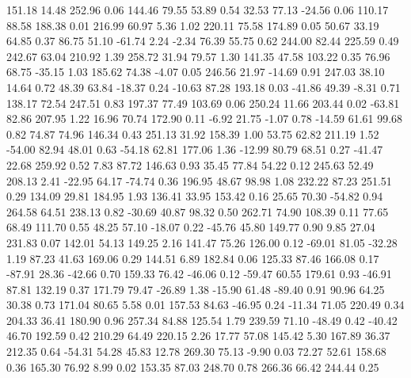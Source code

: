   151.18   14.48  252.96    0.06
  144.46   79.55   53.89    0.54
   32.53   77.13  -24.56    0.06
  110.17   88.58  188.38    0.01
  216.99   60.97    5.36    1.02
  220.11   75.58  174.89    0.05
   50.67   33.19   64.85    0.37
   86.75   51.10  -61.74    2.24
   -2.34   76.39   55.75    0.62
  244.00   82.44  225.59    0.49
  242.67   63.04  210.92    1.39
  258.72   31.94   79.57    1.30
  141.35   47.58  103.22    0.35
   76.96   68.75  -35.15    1.03
  185.62   74.38   -4.07    0.05
  246.56   21.97  -14.69    0.91
  247.03   38.10   14.64    0.72
   48.39   63.84  -18.37    0.24
  -10.63   87.28  193.18    0.03
  -41.86   49.39   -8.31    0.71
  138.17   72.54  247.51    0.83
  197.37   77.49  103.69    0.06
  250.24   11.66  203.44    0.02
  -63.81   82.86  207.95    1.22
   16.96   70.74  172.90    0.11
   -6.92   21.75   -1.07    0.78
  -14.59   61.61   99.68    0.82
   74.87   74.96  146.34    0.43
  251.13   31.92  158.39    1.00
   53.75   62.82  211.19    1.52
  -54.00   82.94   48.01    0.63
  -54.18   62.81  177.06    1.36
  -12.99   80.79   68.51    0.27
  -41.47   22.68  259.92    0.52
    7.83   87.72  146.63    0.93
   35.45   77.84   54.22    0.12
  245.63   52.49  208.13    2.41
  -22.95   64.17  -74.74    0.36
  196.95   48.67   98.98    1.08
  232.22   87.23  251.51    0.29
  134.09   29.81  184.95    1.93
  136.41   33.95  153.42    0.16
   25.65   70.30  -54.82    0.94
  264.58   64.51  238.13    0.82
  -30.69   40.87   98.32    0.50
  262.71   74.90  108.39    0.11
   77.65   68.49  111.70    0.55
   48.25   57.10  -18.07    0.22
  -45.76   45.80  149.77    0.90
    9.85   27.04  231.83    0.07
  142.01   54.13  149.25    2.16
  141.47   75.26  126.00    0.12
  -69.01   81.05  -32.28    1.19
   87.23   41.63  169.06    0.29
  144.51    6.89  182.84    0.06
  125.33   87.46  166.08    0.17
  -87.91   28.36  -42.66    0.70
  159.33   76.42  -46.06    0.12
  -59.47   60.55  179.61    0.93
  -46.91   87.81  132.19    0.37
  171.79   79.47  -26.89    1.38
  -15.90   61.48  -89.40    0.91
   90.96   64.25   30.38    0.73
  171.04   80.65    5.58    0.01
  157.53   84.63  -46.95    0.24
  -11.34   71.05  220.49    0.34
  204.33   36.41  180.90    0.96
  257.34   84.88  125.54    1.79
  239.59   71.10  -48.49    0.42
  -40.42   46.70  192.59    0.42
  210.29   64.49  220.15    2.26
   17.77   57.08  145.42    5.30
  167.89   36.37  212.35    0.64
  -54.31   54.28   45.83   12.78
  269.30   75.13   -9.90    0.03
   72.27   52.61  158.68    0.36
  165.30   76.92    8.99    0.02
  153.35   87.03  248.70    0.78
  266.36   66.42  244.44    0.25
